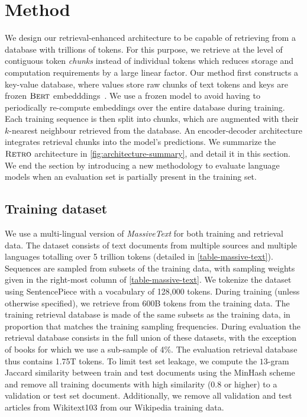 \section{Method}
\label{sec-methods}

We design our retrieval-enhanced architecture to be capable of retrieving from a database with trillions of tokens. For this purpose, we retrieve at the level of contiguous token \textit{chunks} instead of individual tokens which reduces storage and computation requirements by a large linear factor. Our method first constructs a key-value database, where values store raw chunks of text tokens and keys are frozen $\textsc{Bert}$ embedddings~\citep{devlin2019bert}. We use a frozen model to avoid having to periodically re-compute embeddings over the entire database during training. Each training sequence is then split into chunks, which are augmented with their $k$-nearest neighbour retrieved from the database. An encoder-decoder architecture integrates retrieval chunks into the model's predictions. We summarize the $\textsc{Retro}$ architecture in \autoref{fig:architecture-summary}, and detail it in this section. We end the section by introducing a new methodology to evaluate language models when an evaluation set is partially present in the training set.

\subsection{Training dataset}
\label{subsec-training-dataset}
We use a multi-lingual version of \textit{MassiveText} \citep{rae2021gopher} for both training and retrieval data. The dataset consists of text documents from multiple sources and multiple languages totalling over 5 trillion tokens (detailed in \autoref{table-massive-text}). Sequences are sampled from subsets of the training data, with sampling weights given in the right-most column of \autoref{table-massive-text}.
We tokenize the dataset using SentencePiece \citep{kudo2018} with a vocabulary of 128,000 tokens. During training (unless otherwise specified), we retrieve from 600B tokens from the training data. The training retrieval database is made of the same subsets as the training data, in proportion that matches the training sampling frequencies. During evaluation the retrieval database consists in the full union of these datasets, with the exception of books for which we use a sub-sample of 4\%.
The evaluation retrieval database thus contains 1.75T tokens. To limit test set leakage, we compute the $13$-gram Jaccard similarity between train and test documents using the MinHash scheme and remove all training documents with high similarity (0.8 or higher) to a validation or test set document. Additionally, we remove all validation and test articles from Wikitext103 \citep{merity2016pointer} from our Wikipedia training data.

